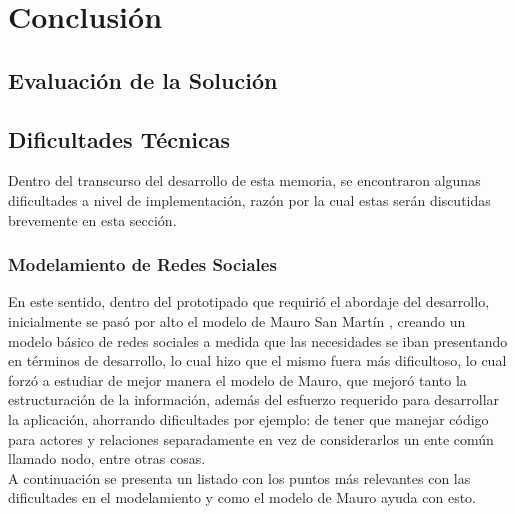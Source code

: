 \chapter{Conclusión}

\section{Evaluación de la Solución} %
\label{sec:evaluacion_de_la_solucion}


\section{Dificultades Técnicas} %
\label{sec:dificultades_tecnicas}


Dentro del transcurso del desarrollo de esta memoria, se encontraron algunas dificultades a nivel de implementación, razón por la cual estas serán discutidas brevemente en esta sección.

\subsection{Modelamiento de Redes Sociales} %
\label{sub:modelamiento_de_redes_sociales}

En este sentido, dentro del prototipado que requirió el abordaje del desarrollo, inicialmente se pasó por alto el modelo de Mauro San Martín \cite{tesismauro}, creando un modelo básico de redes sociales a medida que las necesidades se iban presentando en términos de desarrollo, lo cual hizo que el mismo fuera más dificultoso, lo cual forzó a estudiar de mejor manera el modelo de Mauro, que mejoró tanto la estructuración de la información, además del esfuerzo requerido para desarrollar la aplicación, ahorrando dificultades por ejemplo: de tener que manejar código para actores y relaciones separadamente en vez de considerarlos un ente común llamado nodo, entre otras cosas.\\

A continuación se presenta un listado con los puntos más relevantes con las dificultades en el modelamiento y como el modelo de Mauro ayuda con esto.

